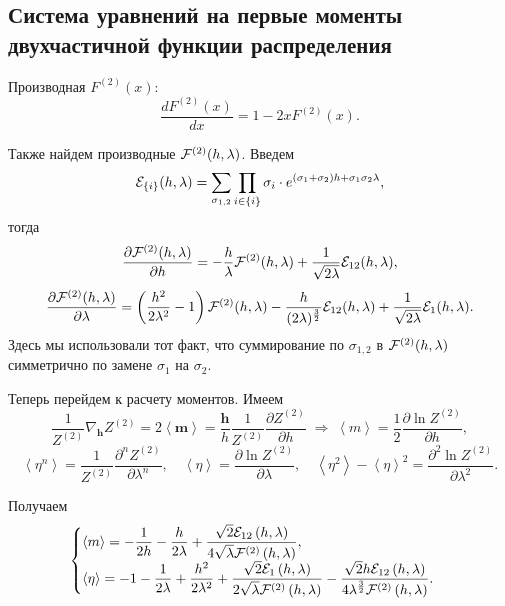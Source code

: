 \documentclass[12pt]{article}
\def\m{\mathbf m{}}
\def\sr#1{\left<#1\right>}
\def\ZV{Z^{(2)}}
\def\FV{F^{(2)}}
\def\cFV{{\cal F}^{(2)}}
\begin{document}
\subsection*{Система уравнений на первые моменты двухчастичной функции распределения}
Производная $\FV(x)$:
\begin{equation}
  \frac{d \FV(x)}{dx} = 1 - 2x\FV(x).
\end{equation}

Также найдем производные $\cFV(h, \lambda)$. Введем
\begin{equation}
    {\cal E}_{\{i\}}(h, \lambda) = \sum\limits_{\sigma_{1,2}} \prod\limits_{i\in\{i\}} \sigma_i  \cdot e^{{(\sigma_1+\sigma_2)h+\sigma_1\sigma_2\lambda}},
\end{equation}
тогда
\begin{equation}
    \frac{\partial \cFV(h, \lambda)}{\partial h} = -\frac{h}{\lambda}\cFV(h, \lambda)+ \frac{1}{\sqrt{2\lambda}} {\cal E}_{12}(h, \lambda),
\end{equation}
\begin{equation}
    \frac{\partial \cFV(h, \lambda)}{\partial \lambda} = \left(\frac{h^2}{2\lambda^2}-1\right)\cFV(h, \lambda) - \frac{h}{(2\lambda)^{\frac{3}{2}}} {\cal E}_{12}(h, \lambda) + \frac{1}{\sqrt{2\lambda}} {\cal E}_{1}(h, \lambda).
\end{equation}
Здесь мы использовали тот факт, что суммирование по $\sigma_{1,2}$ в $\cFV(h, \lambda)$ симметрично по замене $\sigma_{1}$ на $\sigma_{2}$.

Теперь перейдем к расчету моментов. Имеем
\begin{equation}
  \frac{1}{\ZV}\nabla_{\mathbf h{}} \ZV = 2\sr\m = \frac{{\mathbf h{}}}{h}\frac{1}{\ZV}\frac{\partial \ZV}{\partial h} \; \Rightarrow \; \sr m = \frac{1}{2}\frac{\partial \ln\ZV}{\partial h},
\end{equation}
\begin{equation}
  \sr{\eta^n} = \frac{1}{\ZV} \frac{\partial^n \ZV}{\partial \lambda^n}, \quad \sr\eta = \frac{\partial \ln \ZV}{\partial \lambda}, \quad \sr{\eta^2} - {\sr\eta}^2 = \frac{\partial^2 \ln \ZV}{\partial \lambda^2}.
\end{equation}

Получаем
\begin{equation}
  \begin{cases}
    \displaystyle 
    \left<m\right> = - \frac{1}{2 h} - \frac{h}{2 \lambda} + \frac{\sqrt{2} {\cal E}_{12}\left(h, \lambda\right)}{4 \sqrt{\lambda} {\cal F}^{(2)}\left(h,\lambda\right)}, 
    \\
    \displaystyle 
    \left<\eta\right> = -1 - \frac{1}{2 \lambda} + \frac{h^{2}}{2 \lambda^{2}} + \frac{\sqrt{2} {\cal E}_{1}\left(h, \lambda\right)}{2 \sqrt{\lambda} {\cal F}^{(2)}\left(h,\lambda\right)} - \frac{\sqrt{2} h {\cal E}_{12}\left(h, \lambda\right)}{4 \lambda^{\frac{3}{2}} {\cal F}^{(2)}\left(h,\lambda\right)}.
  \end{cases}
\end{equation}
\end{document}
